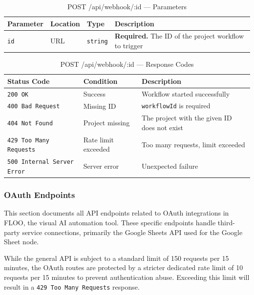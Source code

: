 \begin{table}[H]
\centering
\renewcommand{\arraystretch}{1.3}
\begin{tabularx}{\textwidth}{|l|l|l|X|}
\hline
\textbf{Parameter} & \textbf{Location} & \textbf{Type} & \textbf{Description} \\
\hline
\texttt{id} & URL & \texttt{string} & \textbf{Required.} The ID of the project workflow to trigger \\
\hline
\end{tabularx}
\caption{POST /api/webhook/:id — Parameters}
\label{tab:run-workflow-params}
\end{table}

\begin{table}[H]
\centering
\renewcommand{\arraystretch}{1.3}
\begin{tabularx}{\textwidth}{|l|l|X|}
\hline
\textbf{Status Code} & \textbf{Condition} & \textbf{Description} \\
\hline
\texttt{200 OK}           & Success            & Workflow started successfully \\
\hline
\texttt{400 Bad Request}  & Missing ID         & \texttt{workflowId} is required \\
\hline
\texttt{404 Not Found}    & Project missing    & The project with the given ID does not exist \\
\hline
\texttt{429 Too Many Requests} & Rate limit exceeded & Too many requests, limit exceeded \\
\hline
\texttt{500 Internal Server Error} & Server error & Unexpected failure \\
\hline
\end{tabularx}
\caption{POST /api/webhook/:id — Response Codes}
\label{tab:run-workflow-responses}
\end{table}
\FloatBarrier
\subsubsection{OAuth Endpoints}
\label{subsec:oauth-endpoints}

This section documents all API endpoints related to OAuth integrations in FLOO, the visual AI automation tool. These specific endpoints handle third-party service connections, primarily the Google Sheets API used for the Google Sheet node. 

While the general API is subject to a standard limit of 150 requests per 15 minutes, the OAuth routes are protected by a stricter dedicated rate limit of 10 requests per 15 minutes to prevent authentication abuse. Exceeding this limit will result in a \texttt{429 Too Many Requests} response.

